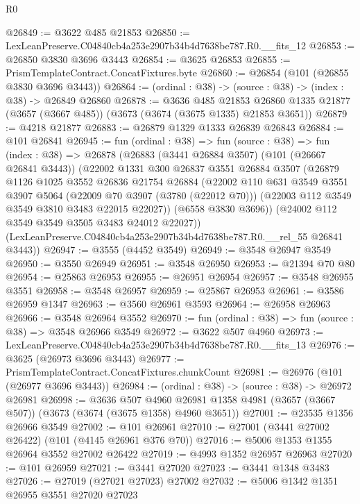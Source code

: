 \begin{lexlean}{R0}
\begin{coremodule}
@26849 := @3622 @485 @21853
@26850 := LexLeanPreserve.C04840cb4a253e2907b34b4d7638be787.R0.__fits_12
@26853 := @26850 @3830 @3696 @3443
@26854 := @3625 @26853
@26855 := PrismTemplateContract.ConcatFixtures.byte
@26860 := @26854 (@101 (@26855 @3830 @3696 @3443))
@26864 := (ordinal : @38) -> (source : @38) -> (index : @38) -> @26849 @26860
@26878 := @3636
    @485
    @21853
    @26860
    @1335
    @21877
    (@3657 (@3667 @485))
    (@3673 (@3674 (@3675 @1335) @21853 @3651))
@26879 := @4218 @21877
@26883 := @26879 @1329 @1333 @26839 @26843
@26884 := @101 @26841
@26945 := fun (ordinal : @38) =>
  fun (source : @38) =>
  fun (index : @38) =>
  @26878
    (@26883
      (@3441 @26884 @3507)
      (@101 (@26667 @26841 @3443))
      (@22002
        @1331
        @300
        @26837
        @3551
        @26884
        @3507
        (@26879
          @1126
          @1025
          @3552
          @26836
          @21754
          @26884
          (@22002
            @110
            @631
            @3549
            @3551
            @3907
            @5064
            (@22009 @70 @3907 (@3780 (@22012 @70)))
            (@22003 @112 @3549 @3549 @3810 @3483 @22015 @22027))
          (@6558 @3830 @3696))
        (@24002 @112 @3549 @3549 @3505 @3483 @24012 @22027))
      (LexLeanPreserve.C04840cb4a253e2907b34b4d7638be787.R0.__rel_55 @26841 @3443))
@26947 := @3555 (@4452 @3549)
@26949 := @3548 @26947 @3549
@26950 := @3550 @26949
@26951 := @3548 @26950
@26953 := @21394 @70 @80
@26954 := @25863 @26953
@26955 := @26951 @26954
@26957 := @3548 @26955 @3551
@26958 := @3548 @26957
@26959 := @25867 @26953
@26961 := @3586 @26959 @1347
@26963 := @3560 @26961 @3593
@26964 := @26958 @26963
@26966 := @3548 @26964 @3552
@26970 := fun (ordinal : @38) => fun (source : @38) => @3548 @26966 @3549
@26972 := @3622 @507 @4960
@26973 := LexLeanPreserve.C04840cb4a253e2907b34b4d7638be787.R0.__fits_13
@26976 := @3625 (@26973 @3696 @3443)
@26977 := PrismTemplateContract.ConcatFixtures.chunkCount
@26981 := @26976 (@101 (@26977 @3696 @3443))
@26984 := (ordinal : @38) -> (source : @38) -> @26972 @26981
@26998 := @3636
    @507
    @4960
    @26981
    @1358
    @4981
    (@3657 (@3667 @507))
    (@3673 (@3674 (@3675 @1358) @4960 @3651))
@27001 := @23535 @1356 @26966 @3549
@27002 := @101 @26961
@27010 := @27001 (@3441 @27002 @26422) (@101 (@4145 @26961 @376 @70))
@27016 := @5006 @1353 @1355 @26964 @3552 @27002 @26422
@27019 := @4993 @1352 @26957 @26963
@27020 := @101 @26959
@27021 := @3441 @27020
@27023 := @3441 @1348 @3483
@27026 := @27019 (@27021 @27023) @27002
@27032 := @5006 @1342 @1351 @26955 @3551 @27020 @27023

\end{coremodule}
\end{lexlean}
